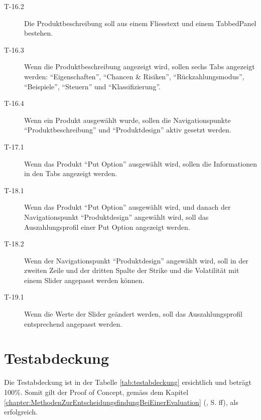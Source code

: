 \begin{description}
\item[T-16.2\label{itm:T-16.2}]
Die Produktbeschreibung soll aus einem Fliesstext und einem TabbedPanel
bestehen.

\item[T-16.3\label{itm:T-16.3}]
Wenn die Produktbeschreibung angezeigt wird, sollen sechs Tabs angezeigt
werden: ``Eigenschaften'', ``Chancen \& Risiken'', ``Rückzahlungsmodus'',
``Beispiele'', ``Steuern'' und ``Klassifizierung''.

\item[T-16.4\label{itm:T-16.4}]
Wenn ein Produkt ausgewählt wurde, sollen die Navigationspunkte
``Produktbeschreibung'' und ``Produktdesign'' aktiv gesetzt werden.

\item[T-17.1\label{itm:T-17.1}]
Wenn das Produkt ``Put Option'' ausgewählt wird, sollen die Informationen in den
Tabs angezeigt werden.

\item[T-18.1\label{img:T-18.1}]
Wenn das Produkt ``Put Option'' ausgewählt wird, und danach der Navigationspunkt
``Produktdesign'' angewählt wird, soll das Auszahlungsprofil einer Put Option
angezeigt werden.

\item[T-18.2\label{img:T-18.2}]
Wenn der Navigationspunkt ``Produktdesign'' angewählt wird, soll in der zweiten
Zeile und der dritten Spalte der Strike und die Volatilität mit einem Slider
angepasst werden können.

\item[T-19.1\label{img:T-19.1}]
Wenn die Werte der Slider geändert werden, soll das Auszahlungsprofil
entsprechend angepasst werden.
\end{description}

\section{Testabdeckung}

Die Testabdeckung ist in der Tabelle \ref{tab:testabdeckung} ersichtlich und
beträgt 100\%. Somit gilt der Proof of Concept, gemäss dem Kapitel
\ref{chapter:MethodenZurEntscheidungsfindungBeiEinerEvaluation}
(, S.
\pageref{chapter:MethodenZurEntscheidungsfindungBeiEinerEvaluation}ff), als
erfolgreich.

